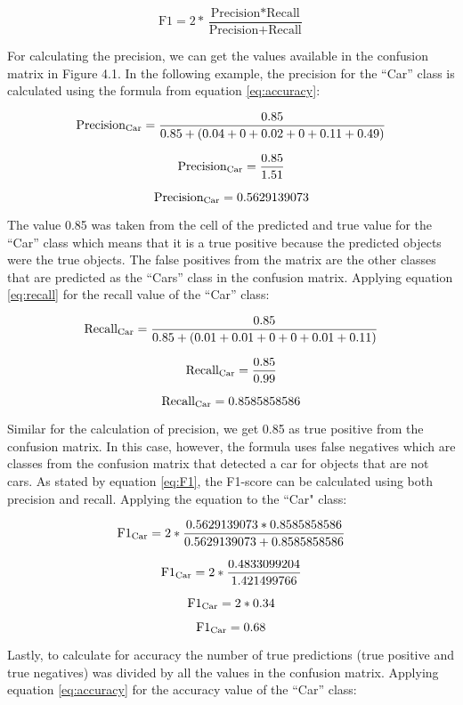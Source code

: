 \begin{equation} \label{eq:F1}
{\text{F1}}= 2 * \frac{\text{Precision}*\text{Recall}}{\text{Precision}+\text{Recall}} 
\end{equation}


For calculating the precision, we can get the values available in the confusion matrix in Figure 4.1. In the following example, the precision for the “Car” class is calculated using the formula from equation \ref{eq:accuracy}:

\[{\text{Precision\textsubscript{Car}}}= \frac{0.85}{0.85+(0.04+0+0.02+0+0.11+0.49)} \]

\[{\text{Precision\textsubscript{Car}}}= \frac{0.85}{1.51} \]

\[{\text{Precision\textsubscript{Car}}}= 0.5629139073 \]

The value 0.85 was taken from the cell of the predicted and true value for the “Car” class which means that it is a true positive because the predicted objects were the true objects. The false positives from the matrix are the other classes that are predicted as the “Cars” class in the confusion matrix. Applying equation \ref{eq:recall} for the recall value of the “Car” class:


\[{\text{Recall\textsubscript{Car}}}= \frac{0.85}{0.85+(0.01+0.01+0+0+0.01+0.11)} \]

\[{\text{Recall\textsubscript{Car}}}= \frac{0.85}{0.99} \]

\[{\text{Recall\textsubscript{Car}}}= 0.8585858586 \]

Similar for the calculation of precision, we get 0.85 as true positive from the confusion matrix. In this case, however, the formula uses false negatives which are classes from the confusion matrix that detected a car for objects that are not cars. As stated by equation \ref{eq:F1}, the F1-score can be calculated using both precision and recall. Applying the equation to the ``Car" class:

\[{\text{F1}\textsubscript{Car}}= 2 * \frac{0.5629139073*0.8585858586}{0.5629139073+0.8585858586} \]

\[{\text{F1}\textsubscript{Car}}= 2 * \frac{0.4833099204}{1.421499766} \]

\[{\text{F1}\textsubscript{Car}}= 2 * 0.34 \]

\[{\text{F1}\textsubscript{Car}}= 0.68 \]

Lastly, to calculate for accuracy the number of true predictions (true positive and true negatives) was divided by all the values in the confusion matrix. Applying equation \ref{eq:accuracy} for the accuracy value of the “Car” class:

